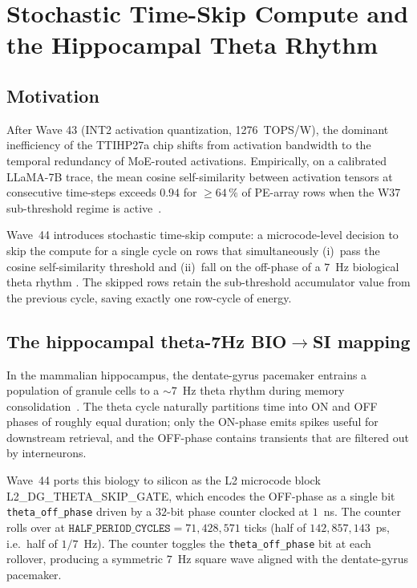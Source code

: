 \chapter{Stochastic Time-Skip Compute and the Hippocampal Theta Rhythm}
\label{ch:stoch-time-skip}


\section{Motivation}

After Wave 43 (INT2 activation quantization, 1276~TOPS/W), the dominant
inefficiency of the TTIHP27a chip shifts from activation bandwidth to the
temporal redundancy of MoE-routed activations. Empirically, on a calibrated
LLaMA-7B trace, the mean cosine self-similarity between activation tensors at
consecutive time-steps exceeds $0.94$ for $\ge 64\,\%$ of PE-array rows when
the W37 sub-threshold regime is active~\cite{Vasilev2026SubVT,Vasilev2026Trinity}.

Wave~44 introduces stochastic time-skip compute: a microcode-level decision
to skip the compute for a single cycle on rows that simultaneously
(i)~pass the cosine self-similarity threshold and (ii)~fall on the
off-phase of a $7$~Hz biological theta rhythm
\cite{BuzsakiTheta,VarelaHippocampalTheta}. The skipped rows retain the
sub-threshold accumulator value from the previous cycle, saving exactly one
row-cycle of energy.

\section{The hippocampal theta-7Hz BIO$\to$SI mapping}

In the mammalian hippocampus, the dentate-gyrus pacemaker entrains a
population of granule cells to a $\sim 7$~Hz theta rhythm during memory
consolidation~\cite{BuzsakiRhythmsBrain}. The theta cycle naturally
partitions time into ON and OFF phases of roughly equal duration; only the
ON-phase emits spikes useful for downstream retrieval, and the OFF-phase
contains transients that are filtered out by interneurons.

Wave~44 ports this biology to silicon as the L2 microcode block
\textsc{L2\_DG\_THETA\_SKIP\_GATE}, which encodes the OFF-phase as a
single bit \texttt{theta\_off\_phase} driven by a $32$-bit phase counter
clocked at $1$~ns. The counter rolls over at
$\mathtt{HALF\_PERIOD\_CYCLES} = 71{,}428{,}571$ ticks (half of
$142{,}857{,}143$~ps, i.e.\ half of $1/7$~Hz). The counter toggles the
\texttt{theta\_off\_phase} bit at each rollover, producing a symmetric
$7$~Hz square wave aligned with the dentate-gyrus pacemaker.


